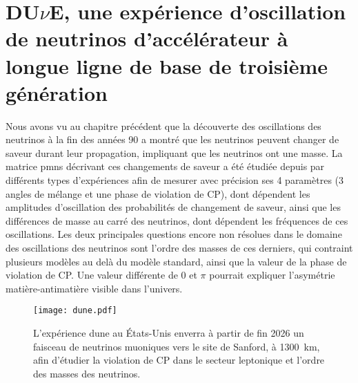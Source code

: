 

\chapter{\texorpdfstring{DU$\nu$E}{DUNE}, une expérience d'oscillation de neutrinos d'accélérateur à longue ligne de base de troisième génération}\label{chap::2}

  Nous avons vu au chapitre précédent que la découverte des oscillations des neutrinos à la fin des années 90 a montré que les neutrinos peuvent changer de saveur durant leur propagation, impliquant que les neutrinos ont une masse. La matrice \gls{pmns} décrivant ces changements de saveur a été étudiée depuis par différents types d'expériences afin de mesurer avec précision ses 4 paramètres (3 angles de mélange et une phase de violation de CP), dont dépendent les amplitudes d'oscillation des probabilités de changement de saveur, ainsi que les différences de masse au carré des neutrinos, dont dépendent les fréquences de ces oscillations. Les deux principales questions encore non résolues dans le domaine des oscillations des neutrinos sont l'ordre des masses de ces derniers, qui contraint plusieurs modèles au delà du modèle standard, ainsi que la valeur de la phase de violation de CP. Une valeur différente de 0 et $\pi$ pourrait expliquer l'asymétrie matière-antimatière visible dans l'univers.

  \begin{figure}[htbp]
    \texttt{[image: dune.pdf]}
    \caption[L'expérience DU$\nu$E]{\label{fig::dune}L'expérience \acrshort{dune} au États-Unis enverra à partir de fin 2026 un faisceau de neutrinos muoniques vers le site de Sanford, à \SI{1300}{\kilo\meter}, afin d'étudier la violation de CP dans le secteur leptonique et l'ordre des masses des neutrinos.}
  \end{figure}

